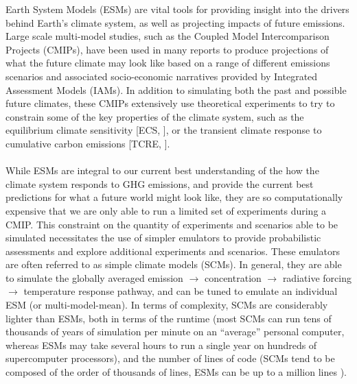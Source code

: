 \documentclass[gmd, manuscript]{copernicus}
\begin{document}
\introduction  %
Earth System Models (ESMs) are vital tools for providing insight into the drivers behind Earth’s climate system, as well as projecting impacts of future emissions. Large scale multi-model studies, such as the Coupled Model Intercomparison Projects (CMIPs), have been used in many reports to produce projections of what the future climate may look like based on a range of different emissions scenarios and associated socio-economic narratives provided by Integrated Assessment Models (IAMs). In addition to simulating both the past and possible future climates, these CMIPs extensively use theoretical experiments to try to constrain some of the key properties of the climate system, such as the equilibrium climate sensitivity [ECS, \cite{Collins2013}], or the transient climate response to cumulative carbon emissions [TCRE, \cite{Allen2009}].\\\\ 
While ESMs are integral to our current best understanding of the how the climate system responds to GHG emissions, and provide the current best predictions for what a future world might look like, they are so computationally expensive that we are only able to run a limited set of experiments during a CMIP. This constraint on the quantity of experiments and scenarios able to be simulated necessitates the use of simpler emulators to provide probabilistic assessments and explore additional experiments and scenarios. These emulators are often referred to as simple climate models (SCMs). In general, they are able to simulate the globally averaged emission $\rightarrow$ concentration $\rightarrow$ radiative forcing $\rightarrow$ temperature response pathway, and can be tuned to emulate an individual ESM (or multi-model-mean). In terms of complexity, SCMs are considerably lighter than ESMs, both in terms of the runtime (most SCMs can run tens of thousands of years of simulation per minute on an ``average'' personal computer, whereas ESMs may take several hours to run a single year on hundreds of supercomputer processors), and the number of lines of code (SCMs tend to be composed of the order of thousands of lines, ESMs can be up to a million lines \citep{Alexander2015}).\\\\
\end{document}
